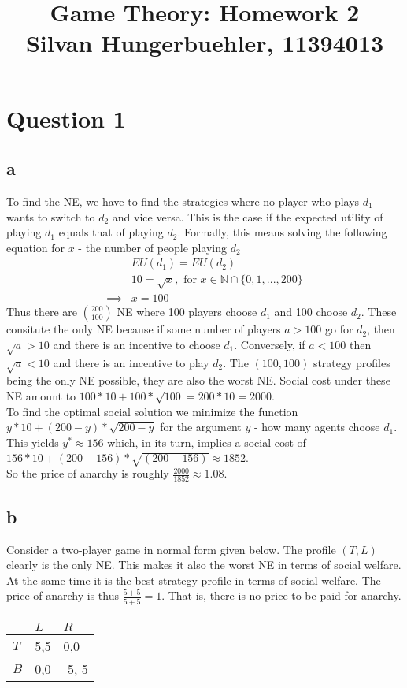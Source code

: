 \documentclass[10pt,a4paper]{article}
\title{%
  Game Theory: Homework 2 \\
  \large Silvan Hungerbuehler, 11394013}
\date{}
\begin{document}
\maketitle

\section*{Question 1}
\subsection*{a}
To find the NE, we have to find the strategies where no player who plays $d_1$ wants to switch to $d_2$ and vice versa. This is the case if the expected utility of playing $d_1$ equals that of playing $d_2$. Formally, this means solving the following equation for $x$ - the number of people playing $d_2$
\begin{align*}
&EU(d_1)=EU(d_2)\\
&10=\sqrt{x}, \text{ for } x\in \mathbb{N}\cap \{0,1,...,200\}\\
\implies &x = 100
\end{align*}
Thus there are $\binom{200}{100}$ NE where 100 players choose $d_1$ and 100 choose $d_2$. These consitute the only NE because if some number of players $a>100$ go for $d_2$, then $\sqrt{a}>10$ and there is an incentive to choose $d_1$. Conversely, if $a<100$ then $\sqrt{a}<10$ and there is an incentive to play $d_2$. The $(100,100)$ strategy profiles being the only NE possible, they are also the worst NE. Social cost under these NE amount to $100*10+100*\sqrt{100}=200*10=2000$.\\
To find the optimal social solution we minimize the function $y*10+(200-y) * \sqrt{200-y}$ for the argument $y$ - how many agents choose $d_1$.
 This yields $y^* \approx 156$ which,  in its turn, implies a social cost of $156 * 10 + (200-156)* \sqrt{(200-156)} \approx 1852$.\\
So the price of anarchy is roughly $\tfrac{2000}{1852}\approx 1.08$.
\subsection*{b}
Consider a two-player game in normal form given below. The profile $(T,L)$ clearly is the only NE. This makes it also the worst NE in terms of social welfare. At the same time it is the best strategy profile in terms of social welfare. The price of anarchy is thus $\tfrac{5+5}{5+5}=1$. That is, there is no price to be paid for anarchy.
\begin{table}[h]
\begin{tabular}{|l|l|l|}
\hline
          & $L$ & $R$  \\ \hline
$T$     & 5,5   & 0,0   \\ \hline
$B$     & 0,0  & -5,-5  \\ \hline
\end{tabular}
\end{table}
\end{document}
